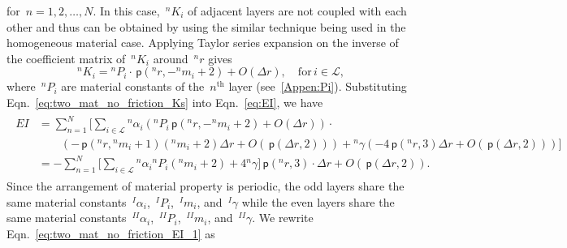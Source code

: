 \documentclass[preprint,10pt,times]{elsarticle}
\numberwithin{equation}{section}
\newcommand{\pr}[1]{\left( #1 \right)}
\newcommand{\p}{\,\mathsf{p}}
\renewcommand{\>}{$\Rightarrow$}
\begin{document}
for~$n = 1,2,\dots,N$. In this case,~${}^{n}\!{K_{i}}$ of adjacent layers are not coupled with each other and thus can be obtained by using the similar technique being used in the homogeneous material case. Applying Taylor series expansion on the inverse of the coefficient matrix of~${}^{n}\!{K_{i}}$ around~${}^{n}\!{r}$ gives
\begin{equation}
	{}^{n}\!{K_{i}} = {}^{n}\!{P_{i}} \cdot \p\pr{{}^{n}\!{r},-{}^{n}\!{m_{i}} + 2} + O(\Delta r), \quad \text{for}\, i \in \mathcal{L},
	\label{eq:two_mat_no_friction_Ks}
\end{equation}
where~${}^{n}\!{P_{i}}$ are material constants of the~$n^{\text{th}}$ layer (see~\ref{Appen:Pi}).  Substituting Eqn.~\eqref{eq:two_mat_no_friction_Ks} into Eqn.~\eqref{eq:EI}, we have
\begin{equation}
	\begin{aligned}
	\begin{split}
	EI & = \sum_{n=1}^{N} \bigg[ \sum_{i \in \mathcal{L}} {}^{n}\!{\alpha_{i}} \left( {}^{n}\!{P_{i}} \p\pr{{}^{n}\!{r},-{}^{n}\!{m_{i}} + 2} + O(\Delta r) \right) \cdot \\ & \qquad{} (- \p\pr{{}^{n}\!{r},{}^{n}\!{m_{i}}+1}({}^{n}\!{m_{i}} + 2 ) \Delta r + O(\p\pr{\Delta r,2}))  + {}^{n}\!\gamma (-4 \p\pr{{}^{n}\!{r},3} \Delta r + O(\p\pr{\Delta r,2})) \bigg] \\
	 & = -\sum_{n=1}^{N} \bigg[ \sum_{i \in \mathcal{L}} {}^{n}\!{\alpha_{i}} {}^{n}\!{P_{i}} ({}^{n}\!{m_{i}} + 2) + 4{}^{n}\!\gamma \bigg] \p\pr{{}^{n}\!{r},3} \cdot \Delta r + O(\p\pr{\Delta r,2}).
	\end{split}
	\end{aligned}
	\label{eq:two_mat_no_friction_EI_1}
\end{equation}
Since the arrangement of material property is periodic, the odd layers share the same material constants~${}^{I}\!{\alpha_{i}}$,~${}^{I}\!{P_{i}}$,~${}^{I}\!{m_{i}}$, and~${}^{I}\!\gamma$ while the even layers share the same material constants~${}^{II}\!{\alpha_{i}}$,~${}^{II}\!{P_{i}}$,~${}^{II}\!{m_{i}}$, and~${}^{II}\!\gamma$. We rewrite Eqn.~\eqref{eq:two_mat_no_friction_EI_1} as
\end{document}
